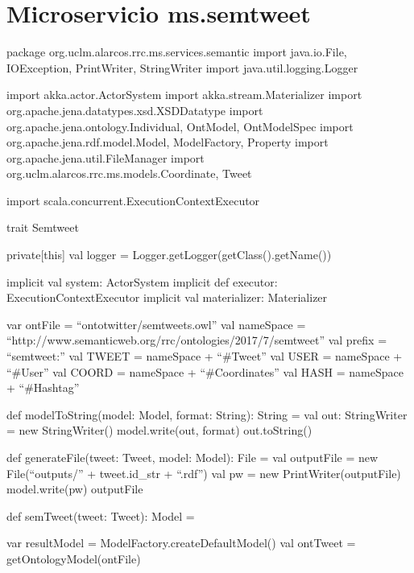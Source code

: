 \chapter{Microservicio ms.semtweet}
\label{chap:ms.semtweet}
\begin{listing}[
  language = scala,
  numbers=left,
  numberstyle=\tiny,
  stepnumber=5,
  numbersep=5pt,
  frame=single,
  caption  = {ms.semtweet: transformación a triplas},
  label    = code:ms.semtweet]


package org.uclm.alarcos.rrc.ms.services.semantic
import java.io.{File, IOException, PrintWriter, StringWriter}
import java.util.logging.Logger

import akka.actor.ActorSystem
import akka.stream.Materializer
import org.apache.jena.datatypes.xsd.XSDDatatype
import org.apache.jena.ontology.{Individual, OntModel, OntModelSpec}
import org.apache.jena.rdf.model.{Model, ModelFactory, Property}
import org.apache.jena.util.FileManager
import org.uclm.alarcos.rrc.ms.models.{Coordinate, Tweet}

import scala.concurrent.ExecutionContextExecutor

trait Semtweet {

  private[this] val logger = Logger.getLogger(getClass().getName())

  implicit val system: ActorSystem
  implicit def executor: ExecutionContextExecutor
  implicit val materializer: Materializer

  var ontFile = ``ontotwitter/semtweets.owl''
  val nameSpace = ``http://www.semanticweb.org/rrc/ontologies/2017/7/semtweet''
  val prefix = ``semtweet:''
  val TWEET = nameSpace + ``#Tweet''
  val USER = nameSpace + ``#User''
  val COORD = nameSpace + ``#Coordinates''
  val HASH = nameSpace + ``#Hashtag''

  def modelToString(model: Model, format: String): String = {
    val out: StringWriter = new StringWriter()
    model.write(out, format)
    out.toString()
  }

  def generateFile(tweet: Tweet, model: Model): File = {
    val outputFile = new File(``outputs/'' + tweet.id_str + ``.rdf'')
    val pw = new PrintWriter(outputFile)
    model.write(pw)
    outputFile
  }

  def semTweet(tweet: Tweet): Model = {
    var resultModel = ModelFactory.createDefaultModel()
    val ontTweet  = getOntologyModel(ontFile)

}}
\end{listing}
